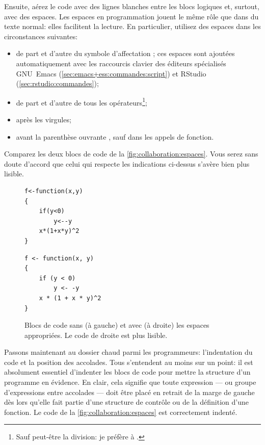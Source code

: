 Ensuite, aérez le code avec des lignes blanches entre les blocs
logiques et, surtout, avec des espaces. Les espaces en programmation
jouent le même rôle que dans du texte normal: elles facilitent la
lecture. En particulier, utilisez des espaces dans les circonstances
suivantes:
\begin{itemize}
\item de part et d'autre du symbole d'affectation \icode{<-}; ces
  espaces sont ajoutées automatiquement avec les raccourcis clavier
  des éditeurs spécialisés GNU~Emacs
  (\autoref{sec:emacs+ess:commandes:script}) et RStudio
  (\autoref{sec:rstudio:commandes});
\item de part et d'autre de tous les opérateurs\footnote{%
    Sauf peut-être la division: je préfère  à .};
\item après les virgules;
\item avant la parenthèse ouvrante \code{(}, sauf dans les appels de
  fonction.
\end{itemize}
Comparez les deux blocs de code de la
\autoref{fig:collaboration:espaces}. Vous serez sans doute d'accord
que celui qui respecte les indications ci-dessus s'avère bien plus
lisible.

\begin{figure}
  \begin{minipage}{0.48\linewidth}
    \begin{Schunk}
\begin{Verbatim}
f<-function(x,y)
{
    if(y<0)
        y<--y
    x*(1+x*y)^2
}
\end{Verbatim}
    \end{Schunk}
  \end{minipage}
  \hfill
  \begin{minipage}{0.48\linewidth}
    \begin{Schunk}
\begin{Verbatim}
f <- function(x, y)
{
    if (y < 0)
        y <- -y
    x * (1 + x * y)^2
}
\end{Verbatim}
    \end{Schunk}
  \end{minipage}
  \caption{Blocs de code sans (à gauche) et avec (à droite) les
    espaces appropriées. Le code de droite est plus lisible.}
  \label{fig:collaboration:espaces}
\end{figure}

Passons maintenant au dossier chaud parmi les programmeurs:
l'indentation du code et la position des accolades. Tous s'entendent
au moins sur un point: il est absolument essentiel d'indenter les
blocs de code pour mettre la structure d'un programme en évidence. En
clair, cela signifie que toute expression --- ou groupe d'expressions
entre accolades --- doit être placé en retrait de la marge de gauche
dès lors qu'elle fait partie d'une structure de contrôle ou de la
définition d'une fonction. Le code de la
\autoref{fig:collaboration:espaces} est correctement indenté.

